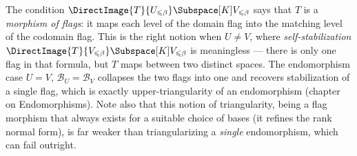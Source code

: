 \begin{remark}
    The condition $\DirectImage{T}{U_{\leqslant\beta}} \Subspace[K] V_{\leqslant\beta}$ says that
    $T$ is a \emph{morphism of flags}: it maps each level of the domain flag into the matching
    level of the codomain flag. This is the right notion when $U \neq V$, where
    \emph{self-stabilization} $\DirectImage{T}{V_{\leqslant\beta}} \Subspace[K] V_{\leqslant\beta}$
    is meaningless --- there is only one flag in that formula, but $T$ maps between two distinct
    spaces. The endomorphism case $U = V$, $\mathcal{B}_U = \mathcal{B}_V$ collapses the two flags
    into one and recovers stabilization of a single flag, which is exactly upper-triangularity of
    an endomorphism (chapter on Endomorphisms). Note also that this notion of triangularity,
    being a flag morphism that always exists for a suitable choice of bases (it refines the rank
    normal form), is far weaker than triangularizing a \emph{single} endomorphism, which can
    fail outright.
\end{remark}
